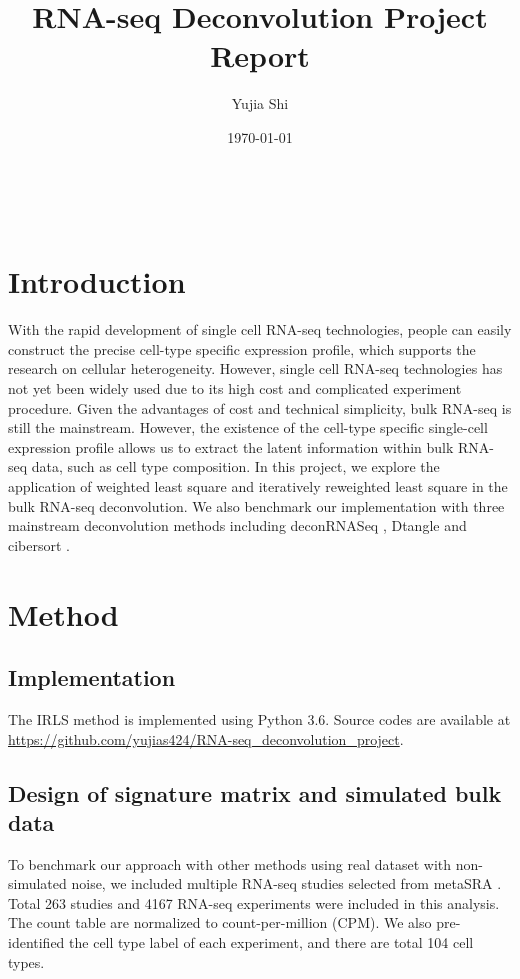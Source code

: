 \documentclass[10pt, a4paper, oneside]{article}
\title{RNA-seq Deconvolution Project Report}
\author{Yujia Shi}
\date{\today}
\begin{document}
\maketitle

\tableofcontents %
\section{Introduction}
With the rapid development of single cell RNA-seq technologies, people can easily construct the precise cell-type specific expression
profile, which supports the research on cellular heterogeneity. However, single cell RNA-seq technologies has not yet been widely
used due to its high cost and complicated experiment procedure. Given the advantages of cost and technical simplicity, bulk RNA-seq
is still the mainstream. However, the existence of the cell-type specific single-cell expression profile allows us to extract the latent
information within bulk RNA-seq data, such as cell type composition. In this project, we explore the application of weighted least square and iteratively reweighted
least square in the bulk RNA-seq deconvolution. We also benchmark our implementation with three mainstream deconvolution methods including deconRNASeq \cite{gong2013deconrnaseq}, Dtangle\cite{hunt2019dtangle} and
cibersort \cite{newman2015robust}.
\section{Method} %

\subsection{Implementation} %
\justify 
The IRLS method is implemented using Python 3.6. Source codes are available at \url{https://github.com/yujias424/RNA-seq_deconvolution_project}.

\subsection{Design of signature matrix and simulated bulk data}
\justify
To benchmark our approach with other methods using real dataset with non-simulated noise, 
we included multiple RNA-seq studies selected from metaSRA \cite{bernstein2017metasra}.
Total 263 studies and 4167 RNA-seq experiments were included in this analysis. 
The count table are normalized to count-per-million (CPM). 
We also pre-identified the cell type label of each experiment, and there are total 104 cell types. 
\end{document}
